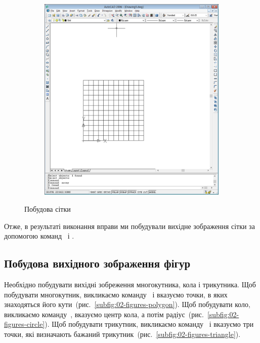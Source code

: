 \documentclass[
	a4paper,
	oneside,
	BCOR = 10mm,
	DIV = 12,
	12pt,
	headings = normal,
]{scrartcl}
\newlength{\gridunitwidth}
\begin{document}
\begin{figure}[!htbp]
\begin{subfigure}[b]{4 \gridunitwidth - (2em / 3)}
					\caption{}
					\label{subfig:01-grid-cell-array}
				\end{subfigure}%
				\hspace{1em}%
				\begin{subfigure}[b]{4 \gridunitwidth - (2em / 3)}
					\centering
					\includegraphics[width = \columnwidth]{./assets/p03.png}
					\caption{}
					\label{subfig:01-grid}
				\end{subfigure}
				\caption{Побудова сітки}
				\label{fig:01-grid-construction}
			\end{figure}

			Отже, в результаті виконання вправи ми побудували вихідне зображення сітки за допомогою команд~ і .

		\subsection{Побудова вихідного зображення фігур}
			Необхідно побудувати вихідні зобреження многокутника, кола і трикутника. Щоб побудувати многокутник, викликаємо команду~ і вказуємо точки, в яких знаходяться його кути~(рис.~\ref{subfig:02-figures-polygon}). Щоб побудувати коло, викликаємо команду~, вказуємо центр кола, а потім радіус~(рис.~\ref{subfig:02-figures-circle}). Щоб побудувати трикутник, викликаємо команду~ і вказуємо три точки, які визначають бажаний трикутник~(рис.~\ref{subfig:02-figures-triangle}).
\end{document}
